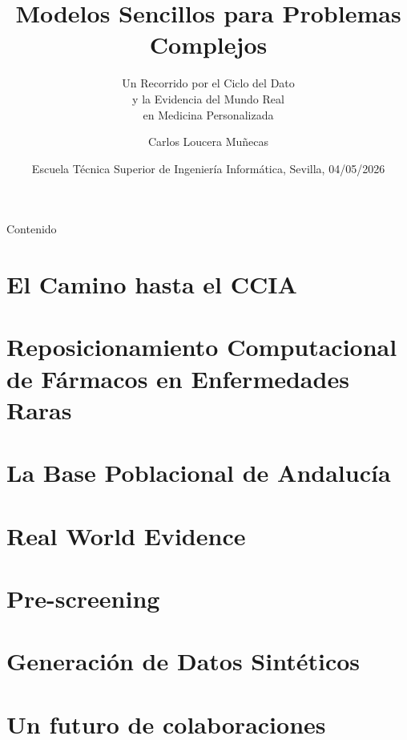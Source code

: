 \documentclass{beamer}
\title{Modelos Sencillos para Problemas Complejos}
\subtitle{Un Recorrido por el Ciclo del Dato \\
y la Evidencia del Mundo Real\\
en Medicina Personalizada}
\author{Carlos Loucera Muñecas}
\institute{Departamento de Ciencias de la Computación e Inteligencia Artificial}
\date{Escuela Técnica Superior de Ingeniería Informática, Sevilla, 04/05/2026}
\begin{document}
  \maketitle

  \begin{frame}{Contenido}
    \tableofcontents[hideallsubsections]
  \end{frame}

  \section[Camino]{El Camino hasta el CCIA}

    

  \section[ER]{Reposicionamiento Computacional de Fármacos en Enfermedades Raras}

    

  \section[BPS]{La Base Poblacional de Andalucía}
    

  \section[RWE]{Real World Evidence}

    

  \section[Screening]{Pre-screening}
    

  \section[short]{Generación de Datos Sintéticos}
    

  \section[Futuro]{Un futuro de colaboraciones}
    
\end{document}
